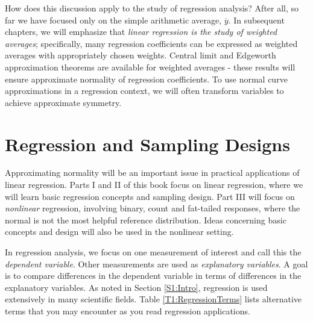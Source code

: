 
How does this discussion apply to the study of regression analysis?
After all, so far we have focused only on the simple arithmetic
average, $\overline{y}$. In subsequent chapters, we will emphasize
that \emph{linear regression is the study of weighted averages};
specifically, many regression coefficients can be expressed as
weighted averages with appropriately chosen weights. Central limit
and Edgeworth approximation theorems are available for weighted
averages - these results will ensure approximate normality of
regression coefficients. To use normal curve approximations in a
regression context, we will often transform variables to achieve
approximate symmetry.


\section{Regression and Sampling Designs}

Approximating normality will be an important issue in practical
applications of linear regression. Parts I and II of this book focus
on linear regression, where we will learn basic regression concepts
and sampling design. Part III will focus on \emph{nonlinear}
regression, involving binary, count and fat-tailed responses, where
the normal is not the most helpful reference distribution. Ideas
concerning basic concepts and design will also be used in the
nonlinear setting.

In regression analysis, we focus on one measurement of interest and
call this the \emph{dependent variable}. Other measurements are used
as \emph{explanatory variables}. A goal is to compare differences in
the dependent variable in terms of differences in the explanatory
variables. As noted in Section \ref{S1:Intro}, regression is used
extensively in many scientific fields. Table
\ref{T1:RegressionTerms} lists alternative terms that you may
encounter as you read regression applications.



